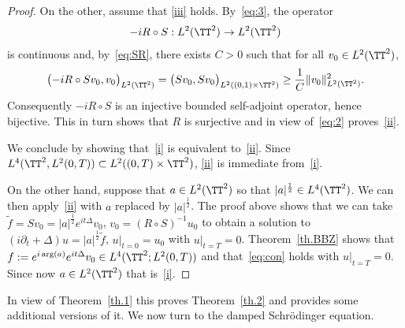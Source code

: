\begin{proof}
On the other, assume that {\eqref{iii}} holds. By~\eqref{eq:3}, the operator
\[
-i R \circ S : L^2(\TT^2) \rightarrow L^2(\TT^2)
\]
is continuous and,
by~\eqref{eq:SR}, there exists $ C > 0 $ such that for all $ v_0 \in L^2(\TT^2) $,
\[
\bigl(-i R \circ S v_0, v_0 \bigr) _{L^2(\TT^2)} = \bigl(Sv_0, S v_0\bigr)_{L^2((0,1) \times \TT^2) } \geq \frac 1 C \| v_0 \|_{L^2(\TT^2)}^2.
\]
Consequently $ -i R \circ S $ is an injective bounded self-adjoint operator, hence bijective. This in turn shows that $R$ is surjective and in view of~\eqref{eq:2} proves~\eqref{ii}.

We conclude by showing that~\eqref{i} is equivalent to~\eqref{ii}. Since $ L^4 (\TT^2, L^2 (0, T)) \subset L^2 ((0, T) \times
\TT^2)$, \eqref{ii} is immediate from~\eqref{i}.

On the other hand, suppose that $ a \in L^2 (\TT^2) $ so that $ |a|^{\frac12} \in L^4 (\TT^2) $. We can then apply~\eqref{ii} with $ a $ replaced by $ |a|^{\frac12 } $. The proof above shows that we can take $ \tilde f = Sv_0 = |a|^{\frac12} e^{it \Delta} v_0$, $ v_0 = (R \circ S)^{-1} u_0 $ to obtain a solution to $ (i \partial_t + \Delta) u = |a|^{\frac12} \tilde f $, $ u|_{t=0} = u_0 $ with $ u |_{t=T}=0 $. Theorem~\ref{th.BBZ} shows that $ f := e^{ i \arg(a)} e^{it \Delta} v_0 \in L^4(\TT^2; L^2(0,T)) $ and that~\eqref{eq:con} holds with $ u |_{t=T}=0 $. Since now $ a \in L^2 (\TT^2) $ that is~\eqref{i}.
\end{proof}

In view of Theorem~\ref{th.1} this proves Theorem~\ref{th.2} and provides some additional versions of it. We now turn to the damped Schrödinger equation.

